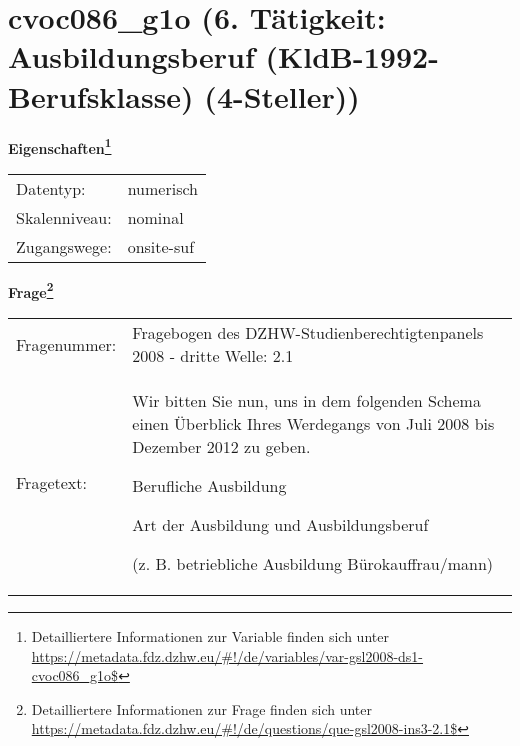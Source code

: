 
    \setcounter{footnote}{0}

    \vspace*{-1.8cm}
	\section{cvoc086\_g1o (6. Tätigkeit: Ausbildungsberuf (KldB-1992-Berufsklasse) (4-Steller))}
	\label{section:cvoc086_g1o}



    \vspace*{0.5cm}
    \noindent\textbf{Eigenschaften\footnote{Detailliertere Informationen zur Variable finden sich unter
		\url{https://metadata.fdz.dzhw.eu/\#!/de/variables/var-gsl2008-ds1-cvoc086_g1o$}}}\\
	\begin{tabularx}{\hsize}{@{}lX}
	Datentyp: & numerisch \\
	Skalenniveau: & nominal \\
	Zugangswege: &
	  onsite-suf
 \\
    \end{tabularx}



				\vspace*{0.5cm}
                \noindent\textbf{Frage\footnote{Detailliertere Informationen zur Frage finden sich unter
		              \url{https://metadata.fdz.dzhw.eu/\#!/de/questions/que-gsl2008-ins3-2.1$}}}\\
				\begin{tabularx}{\hsize}{@{}lX}
					Fragenummer: &
					  Fragebogen des DZHW-Studienberechtigtenpanels 2008 - dritte Welle:
					  2.1
 \\
					Fragetext: & Wir bitten Sie nun, uns in dem folgenden Schema einen Überblick Ihres Werdegangs von Juli 2008 bis Dezember 2012 zu geben.\par  Berufliche Ausbildung\par  Art der Ausbildung und Ausbildungsberuf\par  (z. B. betriebliche Ausbildung Bürokauffrau/mann) \\
				\end{tabularx}





